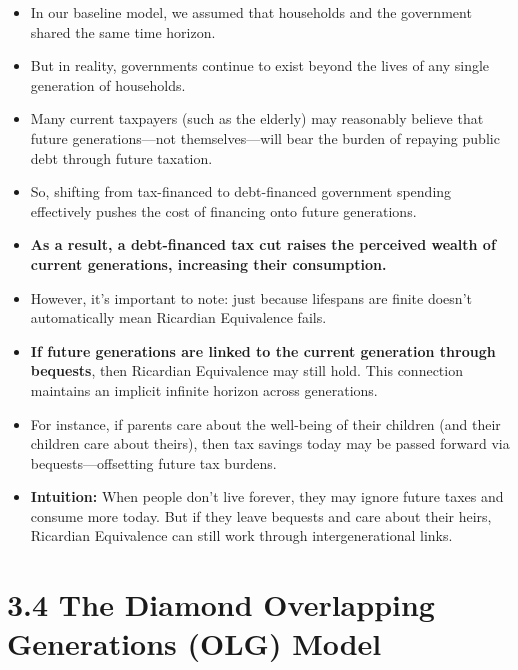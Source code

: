 \documentclass[12pt]{article}
\begin{document}
\begin{itemize}
\item In our baseline model, we assumed that households and the government shared the same time horizon.

\item But in reality, governments continue to exist beyond the lives of any single generation of households.

\item Many current taxpayers (such as the elderly) may reasonably believe that future generations—not themselves—will bear the burden of repaying public debt through future taxation.

\item So, shifting from tax-financed to debt-financed government spending effectively pushes the cost of financing onto future generations.

\item \textbf{As a result, a debt-financed tax cut raises the perceived wealth of current generations, increasing their consumption.}

\item However, it's important to note: just because lifespans are finite doesn’t automatically mean Ricardian Equivalence fails.

\item \textbf{If future generations are linked to the current generation through bequests}, then Ricardian Equivalence may still hold. This connection maintains an implicit infinite horizon across generations.

\item For instance, if parents care about the well-being of their children (and their children care about theirs), then tax savings today may be passed forward via bequests—offsetting future tax burdens.

\item \textbf{Intuition:} When people don’t live forever, they may ignore future taxes and consume more today. But if they leave bequests and care about their heirs, Ricardian Equivalence can still work through intergenerational links.
\end{itemize}

\section*{\noindent\textbf{3.4 The Diamond Overlapping Generations (OLG) Model}}
\end{document}

